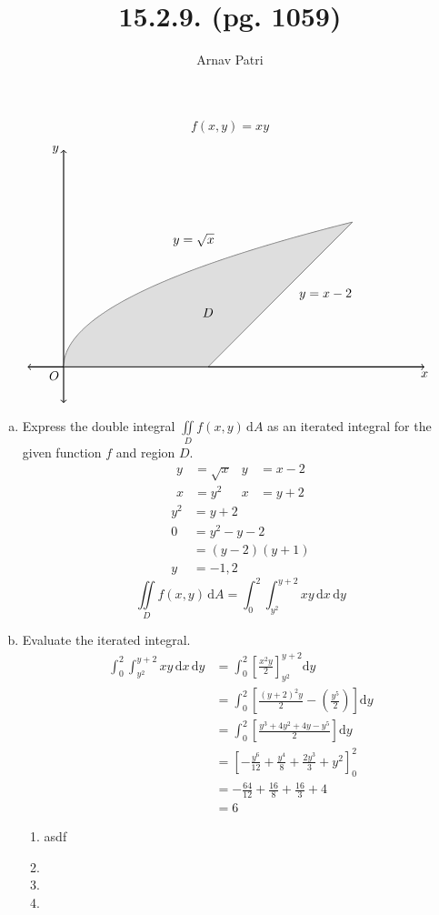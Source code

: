 \documentclass[12pt]{article}
\title{15.2.9. (pg. 1059)}
\author{Arnav Patri}
\renewcommand{\d}{\text{d}}
\begin{document}
	\maketitle
	\thispagestyle{empty}
		\[f(x, y) = xy\]
		\[\begin{tikzpicture}[scale = 2]
			\draw[<->, thick] (-0.5, 0) -- (5, 0) node[below]{$x$};
			\draw[<->, thick] (0, -0.5) -- (0, 3) node[left]{$y$};
			\node[anchor = north east] at (0, 0) {$O$};
			\draw[domain = 0:4, smooth, samples = 300, variable = \x] plot({\x}, {sqrt(\x)});
				\node[above] at (1.8, 1.6) {$y = \sqrt{x}$};
			\draw[] (2, 0) -- (4, 2);
				\node[right] at (3.2, 1) {$y = x - 2$};
			\fill[lightgray, opacity = 0.5, domain = 0:4, smooth, samples = 300, variable = \x] (0, 0) -- plot({\x}, {sqrt(\x)}) -- (2, 0);
			\node at (2, 0.75) {$D$};
		\end{tikzpicture}\]
	\begin{enumerate}[(a)]
		\item 
			Express the double integral $\iint\limits_D f(x, y)\,\d A$ as an iterated integral for the given function $f$ and region $D$. 
			\begin{align*}
				y &= \sqrt{x} &
						y &= x - 2 \\
				x &= y^2 &
						x &= y + 2
			\end{align*}
			\begin{align*}
				y^2 &= y + 2 \\
				0 &= y^2 - y - 2 \\
					&= (y - 2)(y + 1) \\
				y &= -1, 2	
			\end{align*}
			\[\iint\limits_D f(x, y)\,\d A = \int_0^2\int_{y^2}^{y + 2} xy\,\d x\,\d y\]
		\item
			Evaluate the iterated integral.
			\begin{align*}
				\int_0^2\int_{y^2}^{y + 2} xy\,\d x\,\d y &= \int_0^2\left[\frac{x^2y}{2}\right]_{y^2}^{y + 2}\d y \\
					&= \int_0^2\left[\frac{(y + 2)^2y}{2} - \left(\frac{y^5}{2}\right)\right]\d y \\
					&= \int_0^2\left[\frac{y^3 + 4y^2 + 4y - y^5}{2}\right]\d y \\
					&= \left[-\frac{y^6}{12} + \frac{y^4}{8} + \frac{2y^3}{3} + y^2\right]_0^2 \\
					&= -\frac{64}{12} + \frac{16}{8} + \frac{16}{3} + 4 \\
					&= 6
			\end{align*}
		\begin{enumerate}[I]
			\item
				asdf
			\item
			\item
			\item	
		\end{enumerate}
	\end{enumerate}
\end{document}

